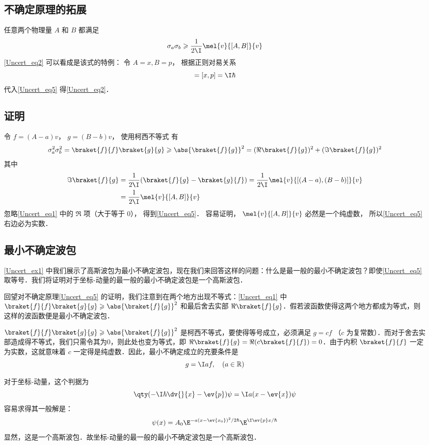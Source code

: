\subsection{不确定原理的拓展}
任意两个物理量 $A$ 和 $B$ 都满足
\begin{equation}\label{Uncert_eq5}
\sigma_a \sigma_b \geqslant \frac{1}{2\I}\mel{v}{[A, B]}{v}
\end{equation}
\autoref{Uncert_eq2} 可以看成是该式的特例： 令 $A = x, B = p$， 根据正则对易关系
\begin{equation}
[A, B] = [x, p] = \I\hbar
\end{equation}
代入\autoref{Uncert_eq5} 得\autoref{Uncert_eq2}． 

\subsection{证明}
令 $f = (A-a)v$， $g = (B-b)v$， 使用柯西不等式 有
\begin{equation}\label{Uncert_eq1}
\sigma_a^2 \sigma_b^2 = \braket{f}{f} \braket{g}{g} \geqslant \abs{\braket{f}{g}}^2 = (\Re\braket{f}{g})^2 + (\Im\braket{f}{g})^2
\end{equation}
其中
\begin{equation}
\begin{aligned}
\Im\braket{f}{g} &= \frac{1}{2\I}(\braket{f}{g} - \braket{g}{f})
= \frac{1}{2\I}\mel{v}{[(A-a), (B-b)]}{v}\\
&= \frac{1}{2\I}\mel{v}{[A, B]}{v}
\end{aligned}
\end{equation}
忽略\autoref{Uncert_eq1} 中的 $\Re$ 项（大于等于 0）， 得到\autoref{Uncert_eq5}． 容易证明， $\mel{v}{[A, B]}{v}$ 必然是一个纯虚数， 所以\autoref{Uncert_eq5} 右边必为实数．
\subsection{最小不确定波包}
\autoref{Uncert_ex1} 中我们展示了高斯波包为最小不确定波包，现在我们来回答这样的问题：什么是最一般的最小不确定波包？即使\autoref{Uncert_eq5} 取等号．我们将证明对于坐标-动量的最一般的最小不确定波包是一个高斯波包．

回望对不确定原理\autoref{Uncert_eq5} 的证明，我们注意到在两个地方出现不等式：\autoref{Uncert_eq1} 中 $\braket{f}{f} \braket{g}{g} \geqslant \abs{\braket{f}{g}}^2$ 和最后舍去实部 $\Re\braket{f}{g}$．假若波函数使得这两个地方都成为等式，则这样的波函数便是最小不确定波包．

$\braket{f}{f} \braket{g}{g} \geqslant \abs{\braket{f}{g}}^2$ 是柯西不等式，要使得等号成立，必须满足 $g=cf$ （$c$ 为复常数）．而对于舍去实部造成得不等式，我们只需令其为0，则此处也变为等式，即 $\Re\braket{f}{g}=\Re( c\braket{f}{f})=0$．由于内积 $\braket{f}{f}$ 一定为实数，这就意味着 $c$ 一定得是纯虚数．因此，最小不确定成立的充要条件是
\begin{equation}
g=\I af,\quad(a\in \mathbb{R})
\end{equation}

对于坐标-动量，这个判据为
\begin{equation}
\qty(-\I\hbar\dv{}{x}-\ev{p})\psi=\I a(x-\ev{x})\psi
\end{equation}
容易求得其一般解是：
\begin{equation}
\psi(x)=A_0\E^{-a(x-\ev{x_0})^2/2\hbar}\E^{\I \ev{p}x/\hbar}
\end{equation}
显然，这是一个高斯波包．故坐标-动量的最一般的最小不确定波包是一个高斯波包．


